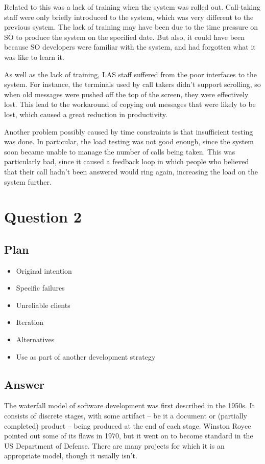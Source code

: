 \documentclass{article}
\begin{document}
Related to this was a lack of training when the system was rolled out. Call-taking staff were only briefly introduced to the system, which was very different to the previous system. The lack of training may have been due to the time pressure on SO to produce the system on the specified date. But also, it could have been because SO developers were familiar with the system, and had forgotten what it was like to learn it.

As well as the lack of training, LAS staff suffered from the poor interfaces to the system. For instance, the terminals used by call takers didn't support scrolling, so when old messages were pushed off the top of the screen, they were effectively lost. This lead to the workaround of copying out messages that were likely to be lost, which caused a great reduction in productivity.

Another problem possibly caused by time constraints is that insufficient testing was done. In particular, the load testing was not good enough, since the system soon became unable to manage the number of calls being taken. This was particularly bad, since it caused a feedback loop in which people who believed that their call hadn't been answered would ring again, increasing the load on the system further.

\section{Question 2}
\subsection{Plan}
\begin{itemize}
\item Original intention
\item Specific failures
\item Unreliable clients
\item Iteration
\item Alternatives
\item Use as part of another development strategy
\end{itemize}

\subsection{Answer}
The waterfall model of software development was first described in the 1950s. It consists of discrete stages, with some artifact -- be it a document or (partially completed) product -- being produced at the end of each stage. Winston Royce pointed out some of its flaws in 1970, but it went on to become standard in the US Department of Defense. There are many projects for which it is an appropriate model, though it usually isn't.
\end{document}
